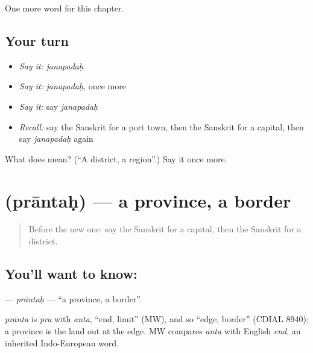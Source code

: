 \begin{grammarlens}[title={What you've built}]
One more word for this chapter.
\end{grammarlens}

\subsection*{Your turn}
\begin{itemize}
\raggedright
  \item \emph{Say it:} \emph{janapadaḥ}
  \item \emph{Say it:} \emph{janapadaḥ}, once more
  \item \emph{Say it:} say \emph{janapadaḥ}
  \item \emph{Recall:} say the Sanskrit for a port town, then the Sanskrit for a capital, then say \emph{janapadaḥ} again
\end{itemize}

\begin{tcolorbox}[breakable,colback=teal!4,colframe=teal!35!black,title={Before you move on}]
What does  mean? (\textquotedblleft{}A district, a region\textquotedblright{}.) Say it once more.
\end{tcolorbox}
\section[\texorpdfstring{\sk{प्रान्तः} (prāntaḥ)}{प्रान्तः (prāntaḥ)}]{ (prāntaḥ) — a province, a border}

\label{lesson:SA-C195-prantah}



\begin{quote}
Before the new one: say the Sanskrit for a capital, then the Sanskrit for a district.
\end{quote}

\subsection*{You'll want to know: }
\textbf{} — \emph{prāntaḥ} — \textquotedblleft{}a province, a border\textquotedblright{}.

\begin{cousinweb}
\emph{prānta} is \emph{pra} with \emph{anta}, \textquotedblleft{}end, limit\textquotedblright{} (MW), and so \textquotedblleft{}edge, border\textquotedblright{} (CDIAL 8940); a province is the land out at the edge. MW compares \emph{anta} with English \emph{end}, an inherited Indo-European word.
\end{cousinweb}

